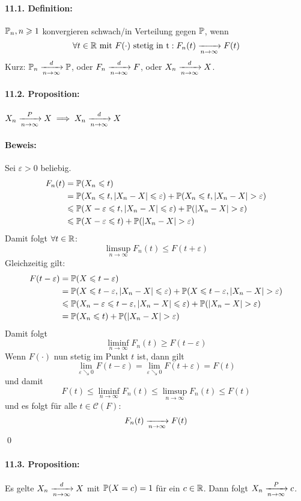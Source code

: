 \documentclass[11pt]{report}
\begin{document}
\paragraph{11.1. Definition:} $\mathbb{P}_n,n\geqslant1$ konvergieren schwach/in Verteilung gegen $\mathbb{P}$, wenn 
    $$\forall t\in\R\text{ mit } F(\cdot) \text{ stetig in t}: F_n(t)\nto{}{n\to\infty}F(t)$$ 
Kurz: $\Pp_n\nto{d}{n\to\infty}\Pp$, oder $F_n\nto{d}{n\to\infty}F$, oder $X_n\nto{d}{n\to\infty}X$.

\paragraph{11.2. Proposition:} $X_n\nto{P}{n\to\infty} X\implies X_n\nto{d}{n\to\infty} X$

\paragraph{Beweis:} Sei $\varepsilon>0$ beliebig.
\begin{align*}
    F_n(t)&=\Pp(X_n\leq t)\\
	&=\Pp(X_n\leq t, |X_n-X|\leq\varepsilon) + \Pp(X_n\leq t,|X_n-X|>\varepsilon) \\
	&\leq\Pp(X-\varepsilon\leq t,|X_n-X|\leq\varepsilon)+\Pp(|X_n-X|>\varepsilon) \\
	&\leq \Pp(X-\varepsilon\leq t)+\Pp(|X_n-X|>\varepsilon)
\end{align*}
Damit folgt $\forall t\in\mathbb{R}$: 
    $$\limsup_{n\to\infty}F_n(t)\leq F(t+\varepsilon)$$
Gleichzeitig gilt:
\begin{align*}
    F(t-\varepsilon)&=\Pp(X\leq t-\varepsilon) \\
	&=\Pp(X\leq t-\varepsilon , |X_n-X|\leq\varepsilon)+\Pp(X\leq t-\varepsilon, |X_n-X|>\varepsilon) \\
	&\leq\Pp(X_n-\varepsilon\leq t-\varepsilon,|X_n-X|\leq\varepsilon)+\Pp(|X_n-X|>\varepsilon) \\
	&=\Pp(X_n\leq t)+\Pp(|X_n-X|>\varepsilon)
\end{align*}
Damit folgt 
    $$\liminf_{n\to\infty}F_n(t)\geq F(t-\varepsilon)$$
Wenn $F(\cdot)$ nun stetig im Punkt $t$ ist, dann gilt 
    $$\lim_{\varepsilon\searrow0}F(t-\varepsilon)=\lim_{\varepsilon\searrow0}F(t+\varepsilon)=F(t)$$
und damit 
	$$F(t)\leq\liminf_{n\to\infty}F_n(t)\leq\limsup_{n\to\infty}F_n(t)\leq F(t)$$	
und es folgt f\"ur alle $t\in\mathcal{C}(F)$:
	$$F_n(t)\nto{}{n\to\infty}F(t)$$
\qed


\paragraph{11.3. Proposition:} Es gelte $X_n\nto{d}{n\to\infty}X$ mit $\mathbb{P}(X=c)=1$ f\"ur ein $c\in\mathbb{R}$. Dann folgt $X_n\nto{P}{n\to\infty}c$.
\end{document}
